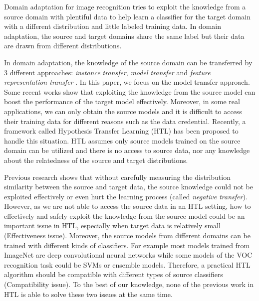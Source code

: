 Domain adaptation for image recognition tries to exploit the knowledge from a source domain with plentiful data to help learn a classifier for the target domain with a different distribution and little labeled training data. In domain adaptation, the source and target domains share the same label but their data are drawn from different distributions.

In domain adaptation, the knowledge of the source domain can be transferred by 3 different approaches: \textit{instance transfer}, \textit{model transfer} and \textit{feature representation transfer} \cite{pan2010survey}. In this paper, we focus on the model transfer approach. Some recent works show that exploiting the knowledge from the source model can boost the performance of the target model effectively\cite{kuzborskij2013n,tommasi2014learning}.
Moreover, in some real applications, we can only obtain the source models and it is difficult to access their training data for different reasons such as the data credential.   
Recently, a framework called Hypothesis Transfer Learning (HTL) \cite{kuzborskij2013stability} has been proposed to handle this situation. HTL assumes only source models trained on the source domain can be utilized and there is no access to source data, nor any knowledge about the relatedness of the source and target distributions. 


Previous research \cite{ben2010theory,ben2007analysis} shows that without carefully measuring the distribution similarity between the source and target data, the source knowledge could not be exploited effectively or even hurt the learning process (called  \textit{negative transfer})\cite{pan2010survey}. 
However, as we are not able to access the source data in an HTL setting, how to effectively and safely exploit the knowledge from the source model could be an important issue in HTL, especially when target data is relatively small (Effectiveness issue). Moreover, the source models from different domains can be trained with different kinds of classifiers. For example most models trained from ImageNet are deep convolutional neural networks while some models of the VOC recognition task could be SVMs or ensemble models. Therefore, a practical HTL algorithm should be compatible with different types of source classifiers (Compatibility issue). To the best of our knowledge, none of the previous work in HTL is able to solve these two issues at the same time.

